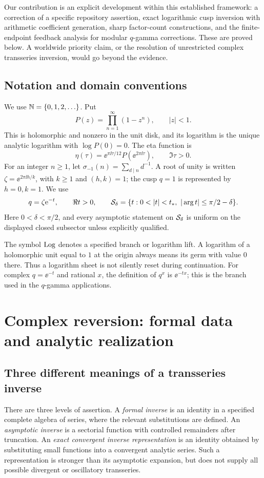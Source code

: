 Our contribution is an explicit development within this established
framework: a correction of a specific repository assertion, exact
logarithmic cusp inversion with arithmetic coefficient generation,
sharp factor-count constructions, and the finite-endpoint feedback
analysis for modular \(q\)-gamma corrections.  These are proved below.
A worldwide priority claim, or the resolution of unrestricted complex
transseries inversion, would go beyond the evidence.

\subsection{Notation and domain conventions}

We use \(\mathbb N=\{0,1,2,\ldots\}\).  Put
\[
 P(z)=\prod_{n=1}^{\infty}(1-z^n),\qquad |z|<1.
\]
This is holomorphic and nonzero in the unit disk, and its logarithm is
the unique analytic logarithm with \(\log P(0)=0\).
The eta function is
\[
 \eta(\tau)=\ee^{\pi\ii\tau/12}P(\ee^{2\pi\ii\tau}),
 \qquad \Im\tau>0.
\]
For an integer \(n\ge1\), let
\(\sigma_{-1}(n)=\sum_{d\mid n}d^{-1}\).
A root of unity is written
\(\zeta=\ee^{2\pi\ii h/k}\), with \(k\ge1\) and \((h,k)=1\);
the cusp \(q=1\) is represented by \(h=0,k=1\).
We use
\[
 q=\zeta\ee^{-t},\qquad \Re t>0,\qquad
 \sectors=\{t:0<|t|<t_*,\ |\arg t|\le\pi/2-\delta\}.
\]
Here \(0<\delta<\pi/2\), and every asymptotic statement on
\(\mathcal S_\delta\) is uniform on the displayed closed subsector unless
explicitly qualified.

The symbol \(\operatorname{Log}\) denotes a specified branch or logarithm lift.
A logarithm of a holomorphic unit equal to \(1\) at the origin always
means its germ with value \(0\) there.  Thus a logarithm sheet is not
silently reset during continuation.  For complex \(q=\ee^{-t}\) and
rational \(x\), the definition of \(q^x\) is \(\ee^{-tx}\);
this is the branch used in the \(q\)-gamma applications.

\section{Complex reversion: formal data and analytic realization}
\label{sec:complex-framework}

\subsection{Three different meanings of a transseries inverse}

There are three levels of assertion.
A \emph{formal inverse} is an identity in a specified complete algebra
of series, where the relevant substitutions are defined.
An \emph{asymptotic inverse} is a sectorial function with controlled
remainders after truncation.
An \emph{exact convergent inverse representation} is an identity
obtained by substituting small functions into a convergent analytic
series.  Such a representation is stronger than its asymptotic expansion,
but does not supply all possible divergent or oscillatory transseries.

